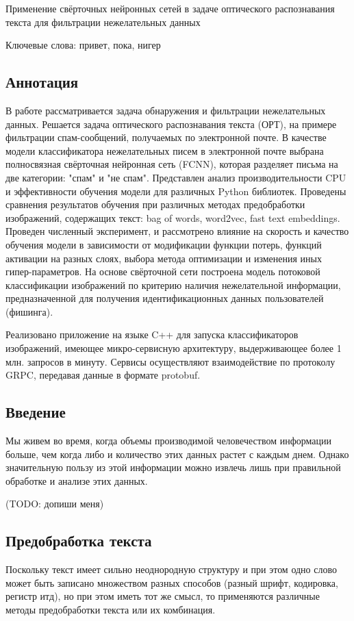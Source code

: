 \documentclass[12pt]{article}
\begin{document}
Применение свёрточных нейронных сетей в задаче оптического распознавания текста для фильтрации нежелательных данных

Ключевые слова: привет, пока, нигер

\subsection*{Аннотация}
В работе рассматривается задача обнаружения и фильтрации нежелательных данных. Решается задача оптического распознавания текста (ОРТ), на примере фильтрации спам-сообщений, получаемых по электронной почте. В качестве модели классификатора нежелательных писем в электронной почте выбрана полносвязная свёрточная нейронная сеть (FCNN), которая разделяет письма на две категории: "спам" и "не спам". Представлен анализ производительности CPU и эффективности обучения модели для различных Python библиотек. Проведены сравнения результатов обучения при различных методах предобработки изображений, содержащих текст: bag of words, word2vec, fast text embeddings. Проведен численный эксперимент, и рассмотрено влияние на скорость и качество обучения модели в зависимости от модификации функции потерь, функций активации на разных слоях, выбора метода оптимизации и изменения иных гипер-параметров. На основе свёрточной сети построена модель потоковой классификации изображений по критерию наличия нежелательной информации, предназначенной для получения идентификационных данных пользователей (фишинга).


Реализовано приложение на языке C++ для запуска классификаторов изображений, имеющее микро-сервисную архитектуру, выдерживающее более 1 млн. запросов в минуту. Сервисы осуществляют взаимодействие по протоколу GRPC, передавая данные в формате protobuf.


\subsection*{Введение}
Мы живем во время, когда объемы производимой человечеством
информации больше, чем когда либо и количество этих данных растет с каждым
днем. Однако значительную пользу из этой информации можно извлечь лишь
при правильной обработке и анализе этих данных.

(TODO: допиши меня)

\subsection*{Предобработка текста}
Поскольку текст имеет сильно неоднородную структуру и при этом одно слово может быть записано множеством разных способов (разный шрифт, кодировка, регистр итд), но при этом иметь тот же смысл, то применяются различные методы предобработки текста или их комбинация.
\end{document}
